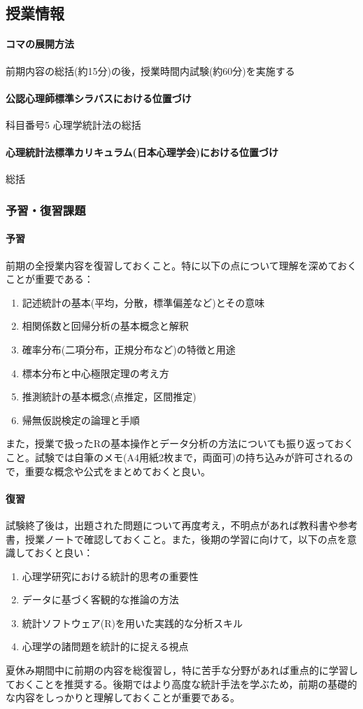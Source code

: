 \subsection{授業情報}
\paragraph{コマの展開方法}
前期内容の総括(約15分)の後，授業時間内試験(約60分)を実施する
\paragraph{公認心理師標準シラバスにおける位置づけ}
科目番号5 心理学統計法の総括
\paragraph{心理統計法標準カリキュラム(日本心理学会)における位置づけ}
総括
\subsubsection{予習・復習課題}
\paragraph{予習}
前期の全授業内容を復習しておくこと。特に以下の点について理解を深めておくことが重要である：
\begin{enumerate}
\item 記述統計の基本(平均，分散，標準偏差など)とその意味
\item 相関係数と回帰分析の基本概念と解釈
\item 確率分布(二項分布，正規分布など)の特徴と用途
\item 標本分布と中心極限定理の考え方
\item 推測統計の基本概念(点推定，区間推定)
\item 帰無仮説検定の論理と手順
\end{enumerate}
また，授業で扱ったRの基本操作とデータ分析の方法についても振り返っておくこと。試験では自筆のメモ(A4用紙2枚まで，両面可)の持ち込みが許可されるので，重要な概念や公式をまとめておくと良い。

\paragraph{復習}
試験終了後は，出題された問題について再度考え，不明点があれば教科書や参考書，授業ノートで確認しておくこと。また，後期の学習に向けて，以下の点を意識しておくと良い：

\begin{enumerate}
\item 心理学研究における統計的思考の重要性
\item データに基づく客観的な推論の方法
\item 統計ソフトウェア(R)を用いた実践的な分析スキル
\item 心理学の諸問題を統計的に捉える視点
\end{enumerate}

夏休み期間中に前期の内容を総復習し，特に苦手な分野があれば重点的に学習しておくことを推奨する。後期ではより高度な統計手法を学ぶため，前期の基礎的な内容をしっかりと理解しておくことが重要である。